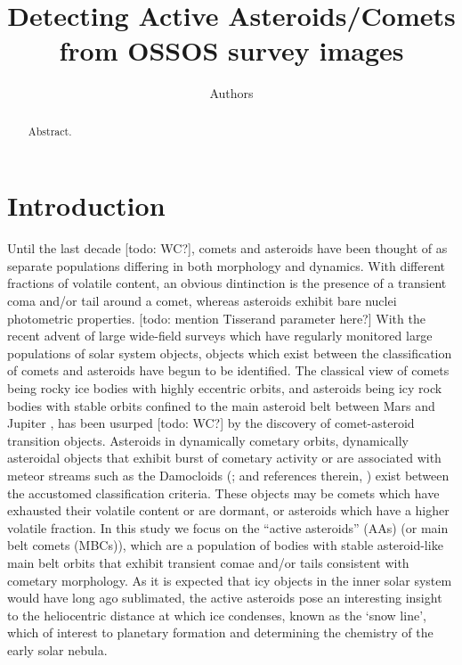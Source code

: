 \documentclass[iop,apj]{emulateapj}
\begin{document}
\title{Detecting Active Asteroids/Comets from OSSOS survey images}
\author{Authors}

\begin{abstract}
Abstract.
\end{abstract}

\maketitle

\section{Introduction}

Until the last decade [todo: WC?], comets and asteroids have been thought of as separate populations differing in  both morphology and dynamics. With different fractions of volatile content, an obvious dintinction is the presence of a transient coma and/or tail around a comet, whereas asteroids exhibit bare nuclei photometric properties. [todo: mention Tisserand parameter here?]  With the recent advent of large wide-field surveys which have regularly monitored large populations of solar system objects, objects which exist between the classification of comets and asteroids have begun to be identified. The classical view of comets being rocky ice bodies with highly eccentric orbits, and asteroids being icy rock bodies with stable orbits confined to the main asteroid belt between Mars and Jupiter \citep{sheppard15}, has been usurped [todo: WC?] by the discovery of comet-asteroid transition objects. Asteroids in dynamically cometary orbits, dynamically asteroidal objects that exhibit burst of cometary activity or are associated with meteor streams such as the Damocloids (\cite{sonnett11}; and references therein, \cite{gilbert09}) exist between the accustomed classification criteria. These objects may be comets which have exhausted their volatile content or are dormant, or asteroids which have a higher volatile fraction. In this study we focus on the ``active asteroids'' (AAs) (or main belt comets (MBCs)), which are a population of bodies with stable asteroid-like main belt orbits that exhibit transient comae and/or tails consistent with cometary morphology.  As it is expected that icy objects in the inner solar system would have long ago sublimated, the active asteroids pose an interesting insight to the heliocentric distance at which ice condenses, known as the `snow line', which of interest to planetary formation and determining the chemistry of the early solar nebula.
\end{document}
